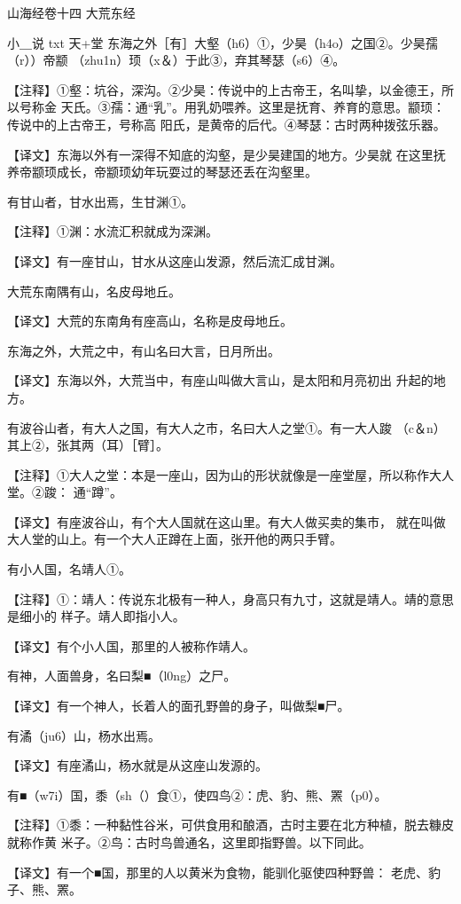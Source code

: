 \documentclass[a4paper,12pt,UTF8,twoside]{ctexbook}
\begin{document}
山海经卷十四 大荒东经

小＿说  txt 天+堂
东海之外［有］大壑（h6）①，少昊（h4o）之国②。少昊孺（r））帝颛 （zhu1n）顼（x＆）于此③，弃其琴瑟（s6）④。

【注释】①壑：坑谷，深沟。②少昊：传说中的上古帝王，名叫挚，以金德王，所以号称金 天氏。③孺：通“乳”。用乳奶喂养。这里是抚育、养育的意思。颛顼：传说中的上古帝王，号称高 阳氏，是黄帝的后代。④琴瑟：古时两种拨弦乐器。

【译文】东海以外有一深得不知底的沟壑，是少昊建国的地方。少昊就 在这里抚养帝颛顼成长，帝颛顼幼年玩耍过的琴瑟还丢在沟壑里。

有甘山者，甘水出焉，生甘渊①。

【注释】①渊：水流汇积就成为深渊。

【译文】有一座甘山，甘水从这座山发源，然后流汇成甘渊。

大荒东南隅有山，名皮母地丘。

【译文】大荒的东南角有座高山，名称是皮母地丘。

东海之外，大荒之中，有山名曰大言，日月所出。

【译文】东海以外，大荒当中，有座山叫做大言山，是太阳和月亮初出 升起的地方。

有波谷山者，有大人之国，有大人之市，名曰大人之堂①。有一大人踆 （c＆n）其上②，张其两（耳）［臂］。

【注释】①大人之堂：本是一座山，因为山的形状就像是一座堂屋，所以称作大人堂。②踆： 通“蹲”。

【译文】有座波谷山，有个大人国就在这山里。有大人做买卖的集市， 就在叫做大人堂的山上。有一个大人正蹲在上面，张开他的两只手臂。

有小人国，名靖人①。

【注释】①：靖人：传说东北极有一种人，身高只有九寸，这就是靖人。靖的意思是细小的 样子。靖人即指小人。

【译文】有个小人国，那里的人被称作靖人。

有神，人面兽身，名曰梨■（l0ng）之尸。

【译文】有一个神人，长着人的面孔野兽的身子，叫做梨■尸。

有潏（ju6）山，杨水出焉。

【译文】有座潏山，杨水就是从这座山发源的。

有■（w7i）国，黍（sh（）食①，使四鸟②：虎、豹、熊、罴（p0）。

【注释】①黍：一种黏性谷米，可供食用和酿酒，古时主要在北方种植，脱去糠皮就称作黄 米子。②鸟：古时鸟兽通名，这里即指野兽。以下同此。

【译文】有一个■国，那里的人以黄米为食物，能驯化驱使四种野兽： 老虎、豹子、熊、罴。
\end{document}
